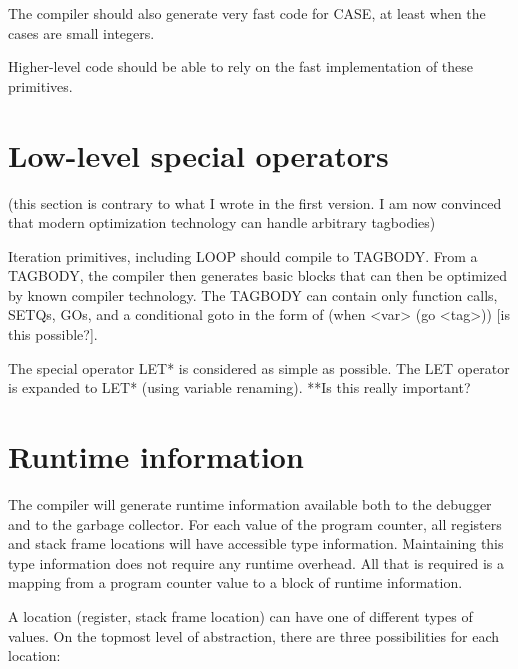 \documentclass{article}
\begin{document}
The compiler should also generate very fast code for CASE, at least
when the cases are small integers.  

Higher-level code should be able to rely on the fast implementation of
these primitives. 

\section{Low-level special operators}

(this section is contrary to what I wrote in the first version.  I am
now convinced that modern optimization technology can handle arbitrary
tagbodies)

Iteration primitives, including LOOP should compile to TAGBODY.  From
a TAGBODY, the compiler then generates basic blocks that can then be
optimized by known compiler technology.  The TAGBODY can contain only
function calls, SETQs, GOs, and a conditional goto in the form of
(when <var> (go <tag>)) [is this possible?].

The special operator LET* is considered as simple as possible.  The
LET operator is expanded to LET* (using variable renaming).  **Is this
really important?

\section{Runtime information}

The compiler will generate runtime information available both to the
debugger and to the garbage collector.  For each value of the program
counter, all registers and stack frame locations will have accessible
type information.  Maintaining this type information does not require
any runtime overhead.  All that is required is a mapping from a
program counter value to a block of runtime information. 

A location (register, stack frame location) can have one of different
types of values.  On the topmost level of abstraction, there are three
possibilities for each location:
\end{document}

